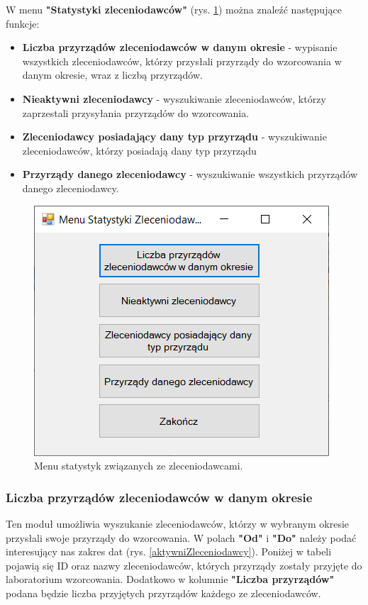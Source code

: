 W menu \textbf{"Statystyki zleceniodawców"} (rys. \ref{menuStatystykiZleceniodawcy}) można znaleźć następujące funkcje:
\begin{itemize}
	\item \textbf{Liczba przyrządów zleceniodawców w danym okresie} - wypisanie wszystkich zleceniodawców, którzy przysłali przyrządy do wzorcowania w danym okresie, wraz z liczbą przyrządów.
	\item \textbf{Nieaktywni zleceniodawcy} - wyszukiwanie zleceniodawców, którzy zaprzestali przysyłania przyrządów do wzorcowania.
	\item \textbf{Zleceniodawcy posiadający dany typ przyrządu} - wyszukiwanie zleceniodawców, którzy posiadają dany typ przyrządu
	\item \textbf{Przyrządy danego zleceniodawcy} - wyszukiwanie wszystkich przyrządów danego zleceniodawcy.
\end{itemize}

\begin{figure}[htb]
	\centering
	\includegraphics{obrazki/Wyszukiwanie/Zleceniodawcy/menu_statystyki_zleceniodawcow.png}
	\caption{Menu statystyk związanych ze zleceniodawcami.}
	\label{menuStatystykiZleceniodawcy}
\end{figure}

\subsubsection{Liczba przyrządów zleceniodawców w danym okresie}
\label{sort_zleceniodawcow}

Ten moduł umożliwia wyszukanie zleceniodawców, którzy w wybranym okresie przysłali swoje przyrządy do wzorcowania. W polach \textbf{"Od"} i \textbf{"Do"} należy podać interesujący nas zakres dat (rys. \ref{aktywniZleceniodawcy}). Poniżej w tabeli pojawią się ID oraz nazwy zleceniodawców, których przyrządy zostały przyjęte do laboratorium wzorcowania. Dodatkowo w kolumnie \textbf{"Liczba przyrządów"} podana będzie liczba przyjętych przyrządów każdego ze zleceniodawców.

